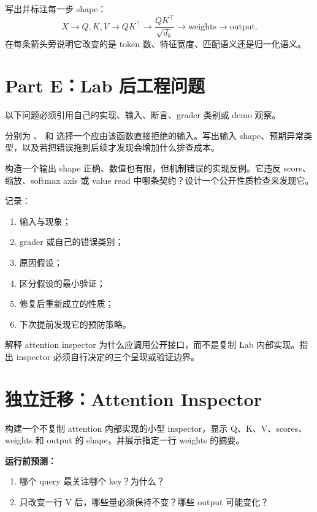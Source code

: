\documentclass[11pt,a4paper]{article}
\begin{document}
写出并标注每一步 shape：
\[
X\rightarrow Q,K,V\rightarrow QK^\top
\rightarrow \frac{QK^\top}{\sqrt{d_k}}
\rightarrow \text{weights}\rightarrow \text{output}.
\]
在每条箭头旁说明它改变的是 token 数、特征宽度、匹配语义还是归一化语义。
\AnswerSpace{46mm}

\section{Part E：Lab 后工程问题}

以下问题必须引用自己的实现、输入、断言、grader 类别或 demo 观察。

分别为 、 和  选择一个应由该函数直接拒绝的输入。写出输入 shape、预期异常类型，以及若把错误拖到后续才发现会增加什么排查成本。
\AnswerSpace{36mm}

构造一个输出 shape 正确、数值也有限，但机制错误的实现反例。它违反 score、缩放、softmax axis 或 value read 中哪条契约？设计一个公开性质检查来发现它。
\AnswerSpace{34mm}

记录：
\begin{enumerate}[label=(\arabic*)]
\item 输入与现象；
\item grader 或自己的错误类别；
\item 原因假设；
\item 区分假设的最小验证；
\item 修复后重新成立的性质；
\item 下次提前发现它的预防策略。
\end{enumerate}
\AnswerSpace{42mm}

解释 attention inspector 为什么应调用公开接口，而不是复制 Lab 内部实现。指出 inspector 必须自行决定的三个呈现或验证边界。
\AnswerSpace{28mm}

\section{独立迁移：Attention Inspector}

构建一个不复制 attention 内部实现的小型 inspector，显示 Q、K、V、scores、weights 和 output 的 shape，并展示指定一行 weights 的摘要。

\textbf{运行前预测：}
\begin{enumerate}[label=(\arabic*)]
\item 哪个 query 最关注哪个 key？为什么？
\item 只改变一行 V 后，哪些量必须保持不变？哪些 output 可能变化？
\end{enumerate}
\end{document}
